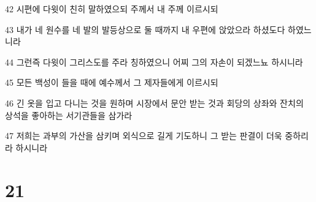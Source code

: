 \par 42 시편에 다윗이 친히 말하였으되 주께서 내 주께 이르시되
\par 43 내가 네 원수를 네 발의 발등상으로 둘 때까지 내 우편에 앉았으라 하셨도다 하였느니라
\par 44 그런즉 다윗이 그리스도를 주라 칭하였으니 어찌 그의 자손이 되겠느뇨 하시니라
\par 45 모든 백성이 들을 때에 예수께서 그 제자들에게 이르시되
\par 46 긴 옷을 입고 다니는 것을 원하며 시장에서 문안 받는 것과 회당의 상좌와 잔치의 상석을 좋아하는 서기관들을 삼가라
\par 47 저희는 과부의 가산을 삼키며 외식으로 길게 기도하니 그 받는 판결이 더욱 중하리라 하시니라

\chapter{21}

